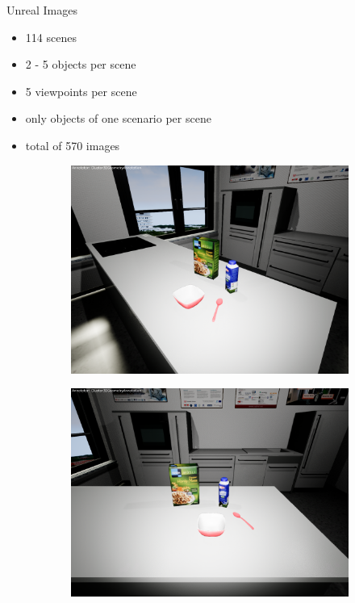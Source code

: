 \documentclass[]{beamer}
\begin{document}
\begin{frame}{Unreal Images}
	\begin{itemize}
		\item 114 scenes
		\item 2 - 5 objects per scene
		\item 5 viewpoints per scene
		\item only objects of one scenario per scene
		\item total of 570 images
	\end{itemize}
	\begin{figure}
\centering
	\begin{subfigure}[b]{0.3\textwidth}
		\includegraphics[scale=.07]{../thesis/img/chapter3/sceneEx_1}
	\end{subfigure}
	\quad
	\begin{subfigure}[b]{0.3\textwidth}
		\includegraphics[scale=.07]{../thesis/img/chapter3/sceneEx_2}	

\end{subfigure}
\end{figure}
\end{frame}
\end{document}
